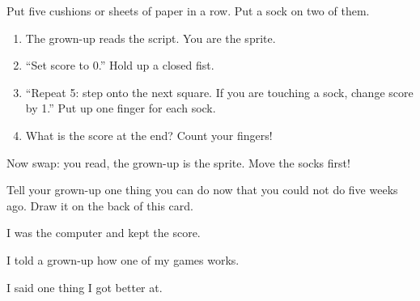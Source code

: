 
\begin{playathome}
Put five cushions or sheets of paper in a row. Put a sock on two of them.
\begin{enumerate}[leftmargin=1.4em,itemsep=2pt]
  \item The grown-up reads the script. You are the sprite.
  \item \enquote{Set score to 0.} Hold up a closed fist.
  \item \enquote{Repeat 5: step onto the next square. If you are touching a sock, change score by 1.} Put up one finger for each sock.
  \item What is the score at the end? Count your fingers!
\end{enumerate}
Now swap: you read, the grown-up is the sprite. Move the socks first!
\end{playathome}

\begin{playathome}
Tell your grown-up one thing you can do now that you could not do five weeks ago. Draw it on the back of this card.
\end{playathome}

\begin{selfcheck}
  \item I was the computer and kept the score.
  \item I told a grown-up how one of my games works.
  \item I said one thing I got better at.
\end{selfcheck}
